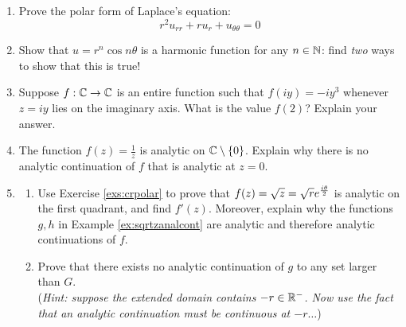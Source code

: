 \begin{exercises*}{}
\begin{enumerate}
	\item Prove the polar form of Laplace's equation:
	\[r^2u_{rr}+ru_r+u_{\theta\theta}=0\]
		
	\item Show that $u=r^n\cos n\theta$ is a harmonic function for any $n\in\mathbb{N}$: find \emph{two} ways to show that this is true!
	
	
	\item Suppose $f:\mathbb{C}\to\mathbb{C}$ is an entire function such that $f(iy)=-iy^3$ whenever $z=iy$ lies on the imaginary axis. What is the value $f(2)$? Explain your answer.
	
	\item The function $f(z)=\frac 1z$ is analytic on $\mathbb{C}\setminus\{0\}$. Explain why there is no analytic continuation of $f$ that is analytic at $z=0$.
	
	\item\label{exs:sqrtzdiff}
	\begin{enumerate}
	  \item Use Exercise \ref{exs:crpolar} to prove that $f(z)=\sqrt z=\sqrt re^{\frac{i\theta}{2}}$ is analytic on the first quadrant, and find $f'(z)$. Moreover, explain why the functions $g, h$ in  Example \ref{ex:sqrtzanalcont} are analytic and therefore analytic continuations of $f$.
	  \item Prove that there exists no analytic continuation of $g$ to any set larger than $G$.\\
		(\emph{Hint: suppose the extended domain contains $-r\in\mathbb{R}^-$. Now use the fact that an analytic continuation must be continuous at $-r\ldots$})
	\end{enumerate}
\end{enumerate}
\end{exercises*}